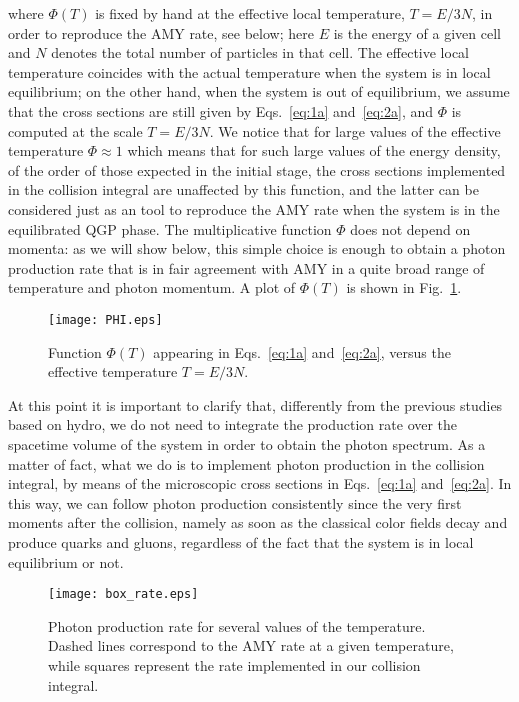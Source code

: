 \documentclass[aps,prc,a4paper,nofootinbib,
preprintnumbers,superscriptaddress,twocolumn,showpacs,showkeys]{revtex4}
\begin{document}
where $\Phi(T)$ is fixed by hand at the effective local temperature, 
$T = E/3N$, in order to reproduce the AMY rate, see below;
here $E$ is the energy of a given cell and
$N$ denotes the total number of particles in that cell.
The effective local temperature 
coincides with the actual temperature when the system is in local equilibrium;
on the other hand, when the system is out of equilibrium, 
we assume that the cross sections  are still given by Eqs.~\eqref{eq:1a} and~\eqref{eq:2a},
and $\Phi$ is computed at the scale  $T = E/3N$. We notice that
for large values of the effective temperature $\Phi\approx 1$ which means that for such large values
of the energy density, of the order of those expected in the initial stage, the cross sections implemented in the
collision integral are unaffected by this function, and the latter can be considered just as an tool to
reproduce the AMY rate when the system is in the equilibrated QGP phase.
The multiplicative function $\Phi$ does not depend on momenta: as we will show below, this simple choice is enough
to obtain a photon production rate that is in fair agreement with AMY in a quite broad range of temperature
and photon momentum. A plot of $\Phi(T)$ is shown in Fig.~\ref{Fig:phi}.



 

\begin{figure}[t!]
\begin{center}
\texttt{[image: PHI.eps]}
\caption{\label{Fig:phi}Function $\Phi(T)$ appearing in Eqs.~\eqref{eq:1a} and~\eqref{eq:2a},
versus the effective temperature $T=E/3N$.}
\end{center}
\end{figure}

At this point it is important to clarify that, differently from the previous studies based on hydro,
we do not need to integrate the production rate over the spacetime volume of the system in order
to obtain the photon spectrum. As a matter of fact,
what we do is to implement photon production in the collision integral, by means of the  
microscopic cross sections in Eqs.~\eqref{eq:1a} and~\eqref{eq:2a}. In this way, we can follow
photon production consistently since the very  first moments after the collision, namely as soon as
the classical color fields decay and produce quarks and gluons, regardless of the fact that the system
is in local equilibrium or not.



\begin{figure}[t!]
\begin{center}
\texttt{[image: box\_rate.eps]}
\caption{\label{Fig:b1}Photon production rate for several values of the temperature.
Dashed lines correspond to the AMY rate at a given temperature, while squares represent
the rate implemented in our collision integral.}
\end{center}
\end{figure}
\end{document}

